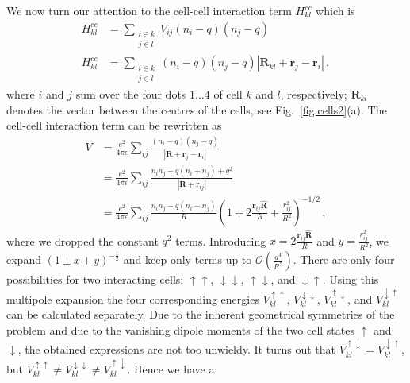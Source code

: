 We now turn our attention to the cell-cell interaction term $H^{cc}_{kl}$ which
is 
%
\begin{equation}
\begin{split}
  H^{cc}_{kl} 
  &=
  \sum_{\substack{i \in k\\j \in l}} V_{ij} \left( n_i - q \right) \left( n_j - q \right) \\
  H^{cc}_{kl}
  &= 
  \sum_{\substack{i \in k\\j \in l}} \left( n_i - q \right) \left( n_j - q \right)
  {\left| \bm{R}_{kl} + \bm{r}_j - \bm{r}_i \right|} \, ,
\end{split}
\end{equation}
%
where $i$ and $j$ sum over the four dots $1\ldots4$ of cell $k$ and $l$,
respectively; $\bm{R}_{kl}$ denotes the vector between the centres of the cells,
see Fig.~\ref{fig:cells2}(a). The cell-cell interaction term can be rewritten as
%
\begin{equation}
\begin{split}
  V &= 
  \frac{e^2}{4\pi\epsilon} \sum_{ij} \frac{(n_i-q) (n_j-q)}
  {\left| \bm{R} + \bm{r}_j - \bm{r}_i \right|} \\
  &=
  \frac{e^2}{4\pi\epsilon} \sum_{ij} \frac{n_i n_j - q (n_i + n_j) + q^2}
  {\left| \bm{R} + \bm{r}_{ij} \right|} \\
  &=
  \frac{e^2}{4\pi\epsilon} \sum_{ij} \frac{n_i n_j - q (n_i + n_j)}{R}
  \left( 
  1 + 2 \frac{\bm{r}_{ij} \hat{\bm{R}}}{R} + \frac{r_{ij}^2}{R^2}
  \right)^{-1/2} \, ,
\end{split}
\end{equation}
%
where we dropped the constant $q^2$ terms. Introducing $x = 2 \frac{\bm{r}_{ij}
\hat{\bm{R}}}{R}$ and $y = \frac{r_{ij}^2}{R^2}$, we expand $\left( 1 \pm x + y
\right)^{-\frac{1}{2}}$ and keep only terms up to
$\mathcal{O}\left(\frac{a^4}{R^5}\right)$. There are only four possibilities for
two interacting cells: $\uparrow\uparrow$, $\downarrow\downarrow$,
$\uparrow\downarrow$, and $\downarrow\uparrow$. Using this multipole expansion
the four
corresponding energies $V^{\uparrow\uparrow}_{kl}$, $V^{\downarrow\downarrow}_{kl}$,
$V^{\uparrow\downarrow}_{kl}$, and $V^{\downarrow\uparrow}_{kl}$ can be calculated
separately. Due to the inherent geometrical symmetries of the problem and due to
the vanishing dipole moments of the two cell states $\uparrow$ and
$\downarrow$, the obtained expressions are not too unwieldy. It turns out that
$V^{\uparrow\downarrow}_{kl} = V^{\downarrow\uparrow}_{kl}$, but 
$V^{\uparrow\uparrow}_{kl} \ne V^{\downarrow\downarrow}_{kl} \ne V^{\uparrow\downarrow}_{kl}$. Hence we have a
